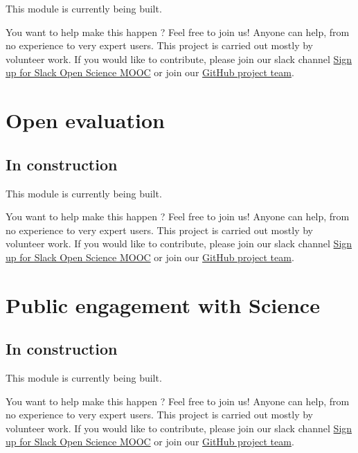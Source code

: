 \documentclass[]{book}
\begin{document}
This module is currently being built.

You want to help make this happen ? Feel free to join us! Anyone can help, from no experience to very expert users. This project is carried out mostly by volunteer work. If you would like to contribute, please join our slack channel \href{https://osmooc.herokuapp.com/}{Sign up for Slack Open Science MOOC} or join our \href{https://open-science-mooc-invite.herokuapp.com/}{GitHub project team}.

\hypertarget{module7}{%
\chapter{Open evaluation}\label{module7}}

\hypertarget{in-construction-4}{%
\section{In construction}\label{in-construction-4}}

This module is currently being built.

You want to help make this happen ? Feel free to join us! Anyone can help, from no experience to very expert users. This project is carried out mostly by volunteer work. If you would like to contribute, please join our slack channel \href{https://osmooc.herokuapp.com/}{Sign up for Slack Open Science MOOC} or join our \href{https://open-science-mooc-invite.herokuapp.com/}{GitHub project team}.

\hypertarget{module8}{%
\chapter{Public engagement with Science}\label{module8}}

\hypertarget{in-construction-5}{%
\section{In construction}\label{in-construction-5}}

This module is currently being built.

You want to help make this happen ? Feel free to join us! Anyone can help, from no experience to very expert users. This project is carried out mostly by volunteer work. If you would like to contribute, please join our slack channel \href{https://osmooc.herokuapp.com/}{Sign up for Slack Open Science MOOC} or join our \href{https://open-science-mooc-invite.herokuapp.com/}{GitHub project team}.
\end{document}
